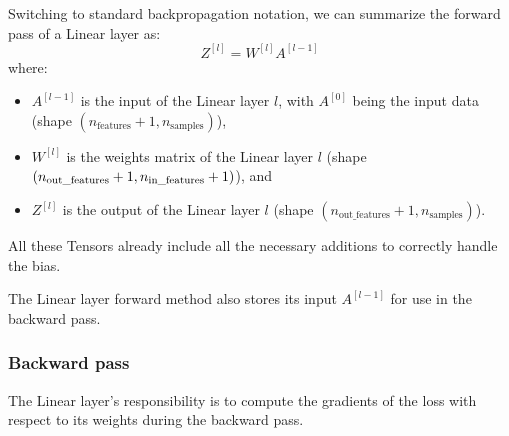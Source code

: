 Switching to standard backpropagation notation, we can summarize the forward pass of a Linear layer as:
\begin{equation}
    Z^{[l]} = W^{[l]} A^{[l - 1]}
\end{equation}
where:
\begin{itemize}
    \item $A^{[l - 1]}$ is the input of the Linear layer $l$, with $A^{[0]}$ being the input data (shape $(n_{\text{features}} + 1, n_{\text{samples}})$),
    \item $W^{[l]}$ is the weights matrix of the Linear layer $l$ (shape $(n_{\text{out\_features}} + 1,\\ n_{\text{in\_features}} + 1)$), and
    \item $Z^{[l]}$ is the output of the Linear layer $l$ (shape $(n_{\text{out\_features}} + 1, n_{\text{samples}})$).
\end{itemize}
All these Tensors already include all the necessary additions to correctly handle the bias.

The Linear layer forward method also stores its input $A^{[l - 1]}$ for use in the backward pass.

\subsubsection{Backward pass}
The Linear layer's responsibility is to compute the gradients of the loss with respect to its weights during the backward pass.
